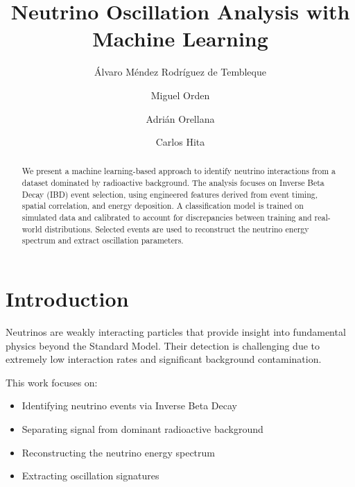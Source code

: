 \documentclass[
  authoryear,
  preprint]{elsarticle}
\providecommand{\tightlist}{%
  \setlength{\itemsep}{0pt}\setlength{\parskip}{0pt}}
\begin{document}
\begin{frontmatter}
\title{Neutrino Oscillation Analysis with Machine Learning}
\author[1]{Álvaro Méndez Rodríguez de Tembleque%
%
}
\author[1]{Miguel Orden%
%
}
\author[1]{Adrián Orellana%
%
}
\author[1]{Carlos Hita%
%
}






        
\begin{abstract}
We present a machine learning-based approach to identify neutrino
interactions from a dataset dominated by radioactive background. The
analysis focuses on Inverse Beta Decay (IBD) event selection, using
engineered features derived from event timing, spatial correlation, and
energy deposition. A classification model is trained on simulated data
and calibrated to account for discrepancies between training and
real-world distributions. Selected events are used to reconstruct the
neutrino energy spectrum and extract oscillation parameters.
\end{abstract}





\end{frontmatter}
    

\section{Introduction}\label{introduction}

Neutrinos are weakly interacting particles that provide insight into
fundamental physics beyond the Standard Model. Their detection is
challenging due to extremely low interaction rates and significant
background contamination.

This work focuses on:

\begin{itemize}
\tightlist
\item
  Identifying neutrino events via Inverse Beta Decay
\item
  Separating signal from dominant radioactive background
\item
  Reconstructing the neutrino energy spectrum
\item
  Extracting oscillation signatures
\end{itemize}
\end{document}
